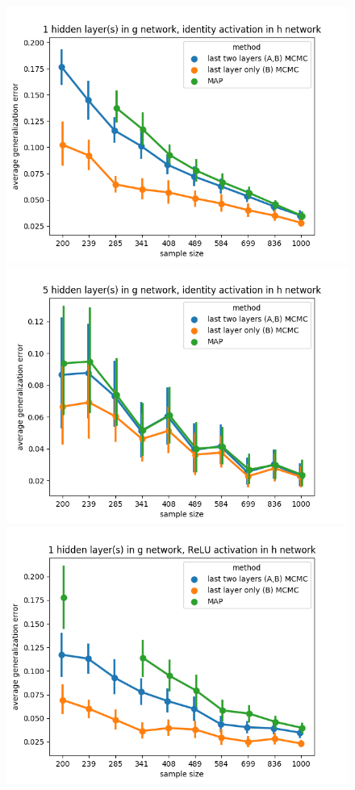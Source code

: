 \documentclass[11pt]{article}
\numberwithin{equation}{section}
\theoremstyle{plain}
\theoremstyle{definition}
\begin{document}
\newpage
\begin{figure}[t!]
	\begin{center}
		\includegraphics[scale=0.45]{taskid4.png}
		\includegraphics[scale=0.45]{taskid5.png}
		\includegraphics[scale=0.45]{taskid6.png}

\end{center}
\end{figure}
\end{document}
